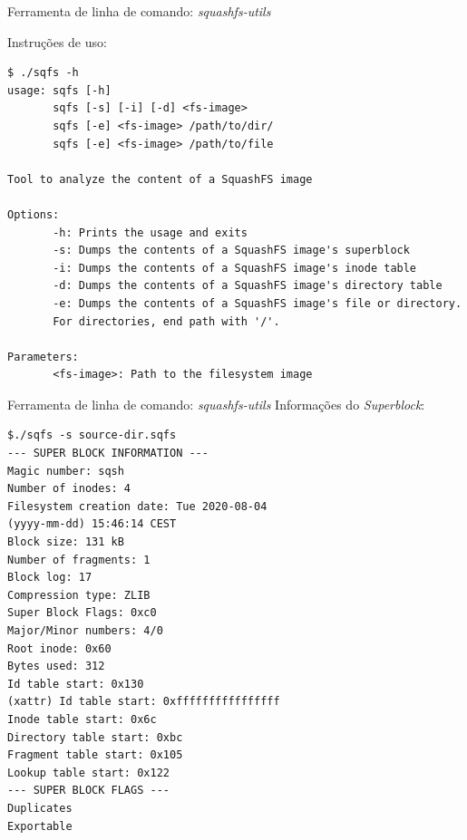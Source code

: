\begin{frame}[fragile]{Ferramenta de linha de comando: \textit{squashfs-utils}}

Instruções de uso:

\begin{verbatim}
$ ./sqfs -h
usage: sqfs [-h]
       sqfs [-s] [-i] [-d] <fs-image>
       sqfs [-e] <fs-image> /path/to/dir/
       sqfs [-e] <fs-image> /path/to/file

Tool to analyze the content of a SquashFS image

Options:
       -h: Prints the usage and exits
       -s: Dumps the contents of a SquashFS image's superblock
       -i: Dumps the contents of a SquashFS image's inode table
       -d: Dumps the contents of a SquashFS image's directory table
       -e: Dumps the contents of a SquashFS image's file or directory.
       For directories, end path with '/'.

Parameters:
       <fs-image>: Path to the filesystem image
\end{verbatim}    
\end{frame}


\begin{frame}[fragile]{Ferramenta de linha de comando: \textit{squashfs-utils}}
Informações do \textit{Superblock}:
\begin{verbatim}
$./sqfs -s source-dir.sqfs 
--- SUPER BLOCK INFORMATION ---
Magic number: sqsh
Number of inodes: 4
Filesystem creation date: Tue 2020-08-04
(yyyy-mm-dd) 15:46:14 CEST
Block size: 131 kB
Number of fragments: 1
Block log: 17
Compression type: ZLIB
Super Block Flags: 0xc0
Major/Minor numbers: 4/0
Root inode: 0x60
Bytes used: 312
Id table start: 0x130
(xattr) Id table start: 0xffffffffffffffff
Inode table start: 0x6c
Directory table start: 0xbc
Fragment table start: 0x105
Lookup table start: 0x122
--- SUPER BLOCK FLAGS ---
Duplicates
Exportable

\end{verbatim}    
\end{frame}


